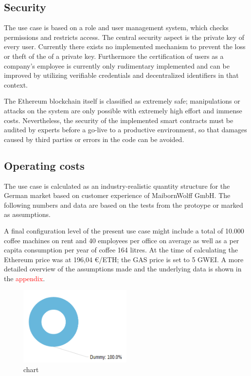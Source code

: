 \documentclass[conference]{IEEEtran}
\begin{document}
\subsection{Security}
The use case is based on a role and user management system, which checks permissions and restricts access. The central security aspect is the private key of every user. Currently there exists no implemented mechanism to prevent the loss or theft of the of a private key. Furthermore the certification of users as a company's employee is currently only rudimentary implemented and can be improved by utilizing verifiable credentials and decentralized identifiers in that context.

The Ethereum blockchain itself is classified as extremely safe; manipulations or attacks on the system are only possible with extremely high effort and immense costs. Nevertheless, the security of the implemented smart contracts must be audited by experts before a go-live to a productive environment, so that damages caused by third parties or errors in the code can be avoided.


\subsection{Operating costs}
The use case is calculated as an industry-realistic quantity structure for the German market based on customer experience of MaibornWolff GmbH. The following numbers and data are based on the tests from the protoype or marked as assumptions.

A final configuration level of the present use case might include a total of 10.000 coffee machines on rent and 40 employees per office on average as well as a per capita consumption per year of coffee 164 litres.
At the time of calculating the Ethereum price was at 196,04 €/ETH; the GAS price is set to 5 GWEI. A more detailed overview of the assumptions made and the underlying data is shown in the \textcolor{red}{appendix}.

\begin{figure}[hbt]
 \centering
 \includegraphics[width=0.5\textwidth]{media/placeholder_chart.png}
 \caption{chart}
 \label{fig:costs}
\end{figure}
\end{document}

